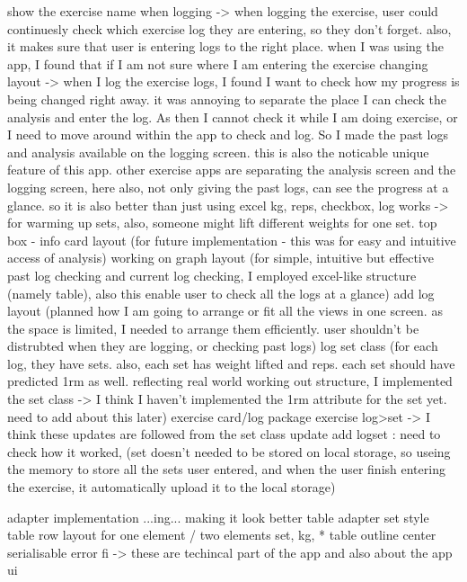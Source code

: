 show the exercise name when logging -> when logging the exercise, user could continuesly check which exercise log they are entering, so they don't forget. also, it makes sure that user is entering logs to the right place. when I was using the app, I found that if I am not sure where I am entering the exercise
changing layout -> when I log the exercise logs, I found I want to check how my progress is being changed right away. it was annoying to separate the place I can check the analysis and enter the log. As then I cannot check it while I am doing exercise, or I need to move around within the app to check and log. So I made the past logs and analysis available on the logging screen. this is also the noticable unique feature of this app. other exercise apps are separating the analysis screen and the logging screen, here also, not only giving the past logs, can see the progress at a glance. so it is also better than just using excel
kg, reps, checkbox, log works -> for warming up sets, also, someone might lift different weights for one set. 
top box - info card layout (for future implementation - this was for easy and intuitive access of analysis)
working on graph layout (for simple, intuitive but effective past log checking and current log checking, I employed excel-like structure (namely table), also this enable user to check all the logs at a glance)
add log layout (planned how I am going to arrange or fit all the views in one screen. as the space is limited, I needed to arrange them efficiently. user shouldn't be distrubted when they are logging, or checking past logs)
log set class (for each log, they have sets. also, each set has weight lifted and reps. each set should have predicted 1rm as well. reflecting real world working out structure, I implemented the set class -> I think I haven't implemented the 1rm attribute for the set yet. need to add about this later)
    exercise card/log package
    exercise log>set
        -> I think these updates are followed from the set class update 
add logset \todo : need to check how it worked, (set doesn't needed to be stored on local storage, so useing the memory to store all the sets user entered, and when the user finish entering the exercise, it automatically upload it to the local storage)

adapter implementation ...ing...
making it look better
table adapter
set style
table row layout for one element / two elements
set, kg, *
table outline
center
serialisable error fi
    -> these are techincal part of the app
    and also about the app ui 

